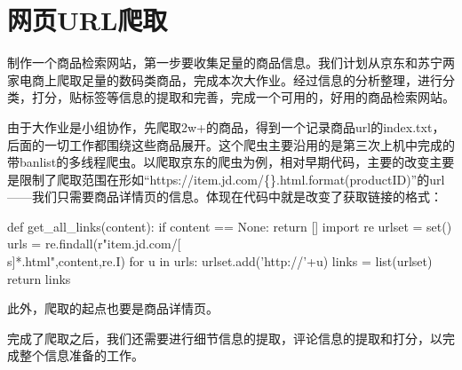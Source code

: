 \section{网页URL爬取}

制作一个商品检索网站，第一步要收集足量的商品信息。我们计划从京东和苏宁两家电商上爬取足量的数码类商品，完成本次大作业。经过信息的分析整理，进行分类，打分，贴标签等信息的提取和完善，完成一个可用的，好用的商品检索网站。

由于大作业是小组协作，先爬取2w+的商品，得到一个记录商品url的index.txt，后面的一切工作都围绕这些商品展开。这个爬虫主要沿用的是第三次上机中完成的带banlist的多线程爬虫。以爬取京东的爬虫为例，相对早期代码，主要的改变主要是限制了爬取范围在形如“https://item.jd.com/\{\}.html.format(productID)”的url——我们只需要商品详情页的信息。体现在代码中就是改变了获取链接的格式：

\begin{python}
def get_all_links(content):
    if content == None:
        return []
    import re
    urlset = set()
    urls = re.findall(r"item.jd.com/[\^\\s]*.html",content,re.I)
    for u in urls:
        urlset.add('http://'+u)
    links = list(urlset)
    return links

\end{python}

此外，爬取的起点也要是商品详情页。

完成了爬取之后，我们还需要进行细节信息的提取，评论信息的提取和打分，以完成整个信息准备的工作。


